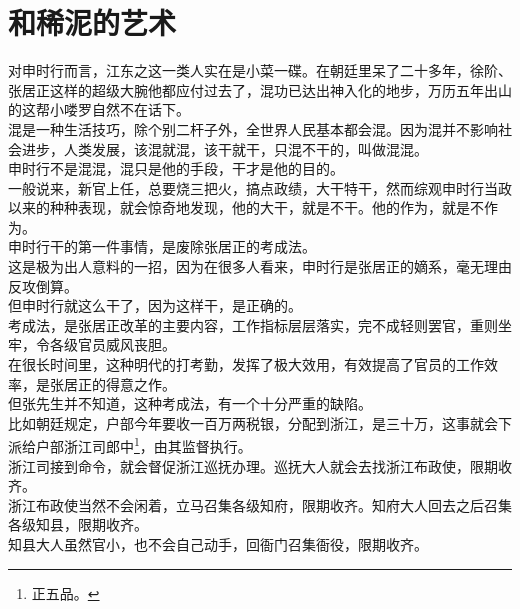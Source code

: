 \section{和稀泥的艺术}
\ifnum{}
	\begin{multicols}{\theparacolNo}
\fi
对申时行而言，江东之这一类人实在是小菜一碟。在朝廷里呆了二十多年，徐阶、张居正这样的超级大腕他都应付过去了，混功已达出神入化的地步，万历五年出山的这帮小喽罗自然不在话下。\\

混是一种生活技巧，除个别二杆子外，全世界人民基本都会混。因为混并不影响社会进步，人类发展，该混就混，该干就干，只混不干的，叫做混混。\\

申时行不是混混，混只是他的手段，干才是他的目的。\\

一般说来，新官上任，总要烧三把火，搞点政绩，大干特干，然而综观申时行当政以来的种种表现，就会惊奇地发现，他的大干，就是不干。他的作为，就是不作为。\\

申时行干的第一件事情，是废除张居正的考成法。\\

这是极为出人意料的一招，因为在很多人看来，申时行是张居正的嫡系，毫无理由反攻倒算。\\

但申时行就这么干了，因为这样干，是正确的。\\

考成法，是张居正改革的主要内容，工作指标层层落实，完不成轻则罢官，重则坐牢，令各级官员威风丧胆。\\

在很长时间里，这种明代的打考勤，发挥了极大效用，有效提高了官员的工作效率，是张居正的得意之作。\\

但张先生并不知道，这种考成法，有一个十分严重的缺陷。\\

比如朝廷规定，户部今年要收一百万两税银，分配到浙江，是三十万，这事就会下派给户部浙江司郎中\footnote{正五品。}，由其监督执行。\\

浙江司接到命令，就会督促浙江巡抚办理。巡抚大人就会去找浙江布政使，限期收齐。\\

浙江布政使当然不会闲着，立马召集各级知府，限期收齐。知府大人回去之后召集各级知县，限期收齐。\\

知县大人虽然官小，也不会自己动手，回衙门召集衙役，限期收齐。\\


\end{multicols}
